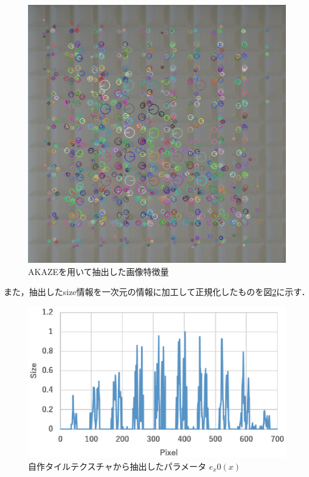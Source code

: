 \begin{figure}[ht]
\begin{center}
  \includegraphics[width=12cm]{AKAZE.eps}
  \caption{AKAZEを用いて抽出した画像特徴量}
  \label{akaze}
\end{center}
\end{figure}

また，抽出したsize情報を一次元の情報に加工して正規化したものを図\ref{kpx}に示す．

\begin{figure}[ht]
\begin{center}
  \includegraphics[width=12cm]{kpx.eps}
  \caption{自作タイルテクスチャから抽出したパラメータ $e_x0(x)$}
  \label{kpx}
\end{center}
\end{figure}

